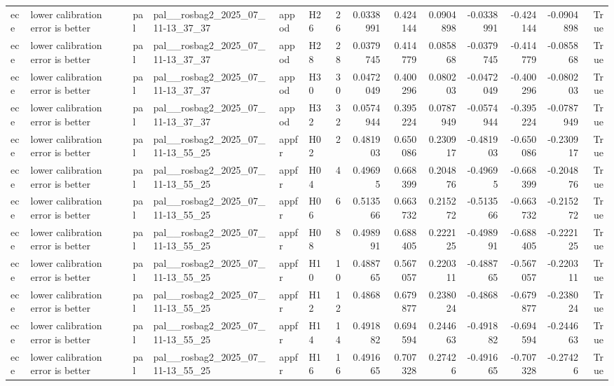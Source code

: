 \begin{longtable}{llllllrrrrrrrr}
ece & lower calibration error is better & pal & pal\_\_rosbag2\_2025\_07\_11-13\_37\_37 & appod & H26 & 26 & 0.0338991 & 0.424144 & 0.0904898 & -0.0338991 & -0.424144 & -0.0904898 & True \\
ece & lower calibration error is better & pal & pal\_\_rosbag2\_2025\_07\_11-13\_37\_37 & appod & H28 & 28 & 0.0379745 & 0.414779 & 0.085868 & -0.0379745 & -0.414779 & -0.085868 & True \\
ece & lower calibration error is better & pal & pal\_\_rosbag2\_2025\_07\_11-13\_37\_37 & appod & H30 & 30 & 0.0472049 & 0.400296 & 0.080203 & -0.0472049 & -0.400296 & -0.080203 & True \\
ece & lower calibration error is better & pal & pal\_\_rosbag2\_2025\_07\_11-13\_37\_37 & appod & H32 & 32 & 0.0574944 & 0.395224 & 0.0787949 & -0.0574944 & -0.395224 & -0.0787949 & True \\
ece & lower calibration error is better & pal & pal\_\_rosbag2\_2025\_07\_11-13\_55\_25 & appfr & H02 & 2 & 0.481903 & 0.650086 & 0.230917 & -0.481903 & -0.650086 & -0.230917 & True \\
ece & lower calibration error is better & pal & pal\_\_rosbag2\_2025\_07\_11-13\_55\_25 & appfr & H04 & 4 & 0.49695 & 0.668399 & 0.204876 & -0.49695 & -0.668399 & -0.204876 & True \\
ece & lower calibration error is better & pal & pal\_\_rosbag2\_2025\_07\_11-13\_55\_25 & appfr & H06 & 6 & 0.513566 & 0.663732 & 0.215272 & -0.513566 & -0.663732 & -0.215272 & True \\
ece & lower calibration error is better & pal & pal\_\_rosbag2\_2025\_07\_11-13\_55\_25 & appfr & H08 & 8 & 0.498991 & 0.688405 & 0.222125 & -0.498991 & -0.688405 & -0.222125 & True \\
ece & lower calibration error is better & pal & pal\_\_rosbag2\_2025\_07\_11-13\_55\_25 & appfr & H10 & 10 & 0.488765 & 0.567057 & 0.220311 & -0.488765 & -0.567057 & -0.220311 & True \\
ece & lower calibration error is better & pal & pal\_\_rosbag2\_2025\_07\_11-13\_55\_25 & appfr & H12 & 12 & 0.4868 & 0.679877 & 0.238024 & -0.4868 & -0.679877 & -0.238024 & True \\
ece & lower calibration error is better & pal & pal\_\_rosbag2\_2025\_07\_11-13\_55\_25 & appfr & H14 & 14 & 0.491882 & 0.694594 & 0.244663 & -0.491882 & -0.694594 & -0.244663 & True \\
ece & lower calibration error is better & pal & pal\_\_rosbag2\_2025\_07\_11-13\_55\_25 & appfr & H16 & 16 & 0.491665 & 0.707328 & 0.27426 & -0.491665 & -0.707328 & -0.27426 & True \\

\end{longtable}
